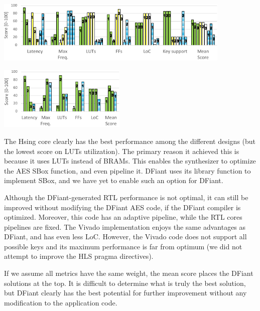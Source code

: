 \begin{table}[t!]
\begin{minipage}[b][3.8cm][b]{0.62\linewidth}
    \includegraphics[height=3cm]{graphics/AES_Compare.pdf} 
    \label{fig:AES_Compare_Graph}
  \end{minipage}
  \hfill
  \begin{minipage}[b][3.8cm][b]{0.37\linewidth}
    \centering
    \includegraphics[height=3cm]{graphics/FP_Compare.pdf} 
    \label{fig:FP_Compare_Graph}
  \end{minipage}
\end{table}

The Hsing core clearly has the best performance among the different designs (but the lowest score on LUTs utilization). The primary reason it achieved this is because it uses LUTs instead of BRAMs. This enables the synthesizer to optimize the AES SBox function, and even pipeline it. DFiant uses its  library function to implement SBox, and we have yet to enable such an option for DFiant. 

Although the DFiant-generated RTL performance is not optimal, it can still  be improved without modifying the DFiant AES code, if the DFiant compiler is optimized. Moreover, this code has an adaptive pipeline, while the RTL cores pipelines are fixed. The Vivado implementation enjoys the same advantages as DFiant, and has even less LoC. However, the Vivado code does not support all possible keys and its maximum performance is far from optimum (we did not attempt to improve the HLS pragma directives).

If we assume all metrics have the same weight, the mean score places the DFiant solutions at the top. It is difficult to determine what is truly the best solution, but DFiant clearly has the best potential for further improvement without any modification to the application code.

